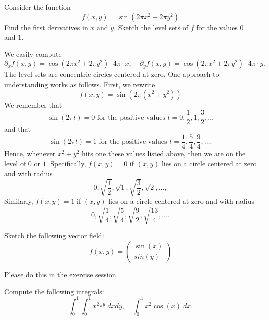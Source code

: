 \documentclass[11pt]{article}
\begin{document}
\begin{exercise}
	Consider the function 
    \[
        f(x,y) = \sin\left( 2\pi x^2 + 2\pi y^2 \right)
    \]
    Find the first derivatives in $x$ and $y$.
    Sketch the level sets of $f$ for the values $0$ and $1$.
\end{exercise}

\begin{solution}
    We easily compute 
    \[
        \partial_x f(x,y) = \cos\left( 2\pi x^2 + 2\pi y^2 \right) \cdot 4\pi \cdot x,
        \quad 
        \partial_y f(x,y) = \cos\left( 2\pi x^2 + 2\pi y^2 \right) \cdot 4\pi \cdot y.
    \]
    The level sets are concentric circles centered at zero. One approach to understanding works as follows.
    First, we rewrite 
    \[
        f(x,y) = \sin\left( 2\pi ( x^2 + y^2 ) \right)
    \]
    We remember 
    that 
    \[
        \sin( 2\pi t ) = 0 \text{ for the positive values } t = 0, \frac 1 2, 1, \frac 3 2, \dots
    \] 
    and 
    that 
    \[
        \sin( 2\pi t ) = 1 \text{ for the positive values } t = \frac 1 4, \frac 5 4, \frac 9 4, \dots.
    \]
    Hence, whenever $x^2 + y^2$ hits one these values listed above, then we are on the level of $0$ or $1$.
    Specifically, $f(x,y) = 0$ if $(x,y)$ lies on a circle centered at zero and with radius
    \[
        0, \sqrt{\frac 1 2}, \sqrt{1}, \sqrt{\frac 3 2}, \sqrt{2}, \dots, 
    \]
    Similarly, $f(x,y) = 1$ if $(x,y)$ lies on a circle centered at zero and with radius
    \[
        0, \sqrt{\frac 1 4}, \sqrt{\frac 5 4}, \sqrt{\frac 9 2}, \sqrt{\frac {13} 4}, \dots. 
    \]
\end{solution}





\begin{exercise}
	Sketch the following vector field:
    \[
        f(x,y) = \left(\begin{array}{c} \sin(x) \\ sin(y) \end{array}\right)
    \]
\end{exercise}

\begin{solution}
    Please do this in the exercise session.
\end{solution}



\begin{exercise}
	Compute the following integrals:
    \[
        \int_0^1 \int_0^1 x^2 e^y \; dx dy,
        \quad 
        \int_0^1 x^2 \cos(x) \; dx.
    \]
\end{exercise}
\end{document}
